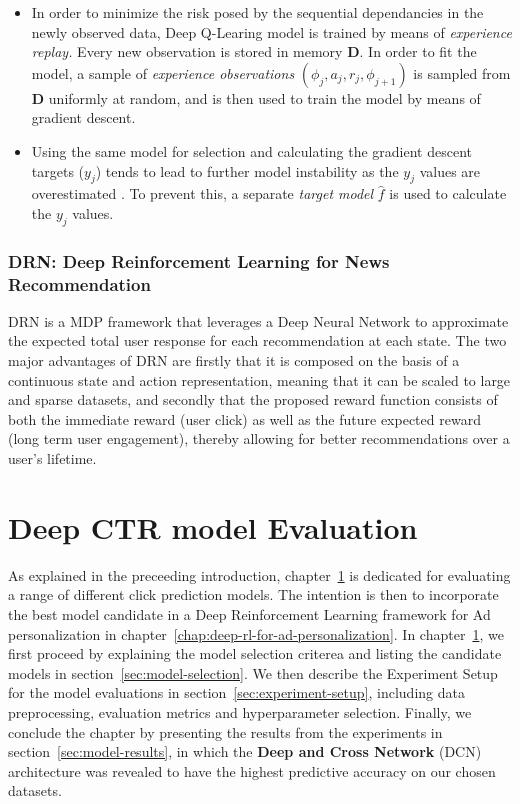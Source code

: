 \documentclass{mldsmsc}
\begin{document}
\begin{itemize}
    \item In order to minimize the risk posed by the sequential dependancies in the newly observed data, Deep Q-Learing
    model is trained by means of \emph{experience replay.} Every new observation is stored in memory $\mathbf{D}$. In order
    to fit the model, a sample of \emph{experience observations}  $(\phi_{j}, a_j, r_j, \phi_{j+1})$ is sampled from $\mathbf{D}$
    uniformly at random, and is then used to train the model by means of gradient descent.
    \item Using the same model for selection and calculating the gradient descent targets ($y_j$) tends to lead to further model instability as the $y_j$ values are overestimated \citep{RefWorks:mnih2015human-level}.
    To prevent this, a separate \emph{target model} $\hat{f}$ is used to calculate the $y_j$ values.
\end{itemize}

\subsection{DRN: Deep Reinforcement Learning for News Recommendation}

DRN \citep{RefWorks:zheng2018drn:} is a MDP framework 
that leverages a Deep Neural Network to approximate the expected total user response for 
each recommendation at each state. The two major advantages of DRN are firstly that it is 
composed on the basis of a continuous state and action representation, meaning that it can 
be scaled to large and sparse datasets, and secondly that the proposed reward function 
consists of both the immediate reward (user click) as well as the future expected reward 
(long term user engagement), thereby allowing for better recommendations over a user’s 
lifetime.

\chapter{Deep CTR model Evaluation}
\label{chap:deep-ctr-model-evaluation}

As explained in the preceeding introduction, chapter~\ref{chap:deep-ctr-model-evaluation} is
dedicated for evaluating a range of different click prediction models. The intention is then to
incorporate the best model candidate in a Deep Reinforcement Learning framework for Ad personalization
in chapter~\ref{chap:deep-rl-for-ad-personalization}. In chapter~\ref{chap:deep-ctr-model-evaluation},
we first proceed by explaining the model selection criterea and listing the candidate models in section~\ref{sec:model-selection}.
We then describe the Experiment Setup for the model evaluations in section~\ref{sec:experiment-setup}, including
data preprocessing, evaluation metrics and hyperparameter selection. Finally, we conclude the chapter
by presenting the results from the experiments in section~\ref{sec:model-results}, in which the \textbf{Deep and Cross Network} (DCN) architecture \citep{RefWorks:wang2017deep}
was revealed to have the highest predictive accuracy on our chosen datasets.
\end{document}

